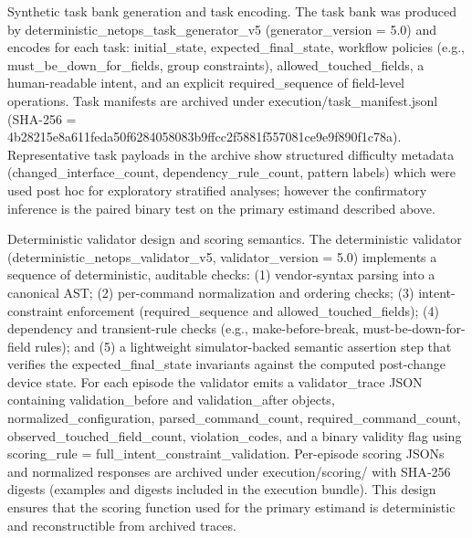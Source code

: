 \documentclass[conference]{IEEEtran}
\begin{document}
Synthetic task bank generation and task encoding. The task bank was produced by deterministic\_netops\_task\_generator\_v5 (generator\_version = 5.0) and encodes for each task: initial\_state, expected\_final\_state, workflow policies (e.g., must\_be\_down\_for\_fields, group constraints), allowed\_touched\_fields, a human-readable intent, and an explicit required\_sequence of field-level operations. Task manifests are archived under execution/task\_manifest.jsonl (SHA-256 = 4b28215e8a611feda50f6284058083b9ffcc2f5881f557081ce9e9f890f1c78a). Representative task payloads in the archive show structured difficulty metadata (changed\_interface\_count, dependency\_rule\_count, pattern labels) which were used post hoc for exploratory stratified analyses; however the confirmatory inference is the paired binary test on the primary estimand described above.

Deterministic validator design and scoring semantics. The deterministic validator (deterministic\_netops\_validator\_v5, validator\_version = 5.0) implements a sequence of deterministic, auditable checks: (1) vendor‑syntax parsing into a canonical AST; (2) per-command normalization and ordering checks; (3) intent-constraint enforcement (required\_sequence and allowed\_touched\_fields); (4) dependency and transient-rule checks (e.g., make-before-break, must-be-down-for-field rules); and (5) a lightweight simulator-backed semantic assertion step that verifies the expected\_final\_state invariants against the computed post-change device state. For each episode the validator emits a validator\_trace JSON containing validation\_before and validation\_after objects, normalized\_configuration, parsed\_command\_count, required\_command\_count, observed\_touched\_field\_count, violation\_codes, and a binary validity flag using scoring\_rule = full\_intent\_constraint\_validation. Per-episode scoring JSONs and normalized responses are archived under execution/scoring/ with SHA‑256 digests (examples and digests included in the execution bundle). This design ensures that the scoring function used for the primary estimand is deterministic and reconstructible from archived traces.
\end{document}
